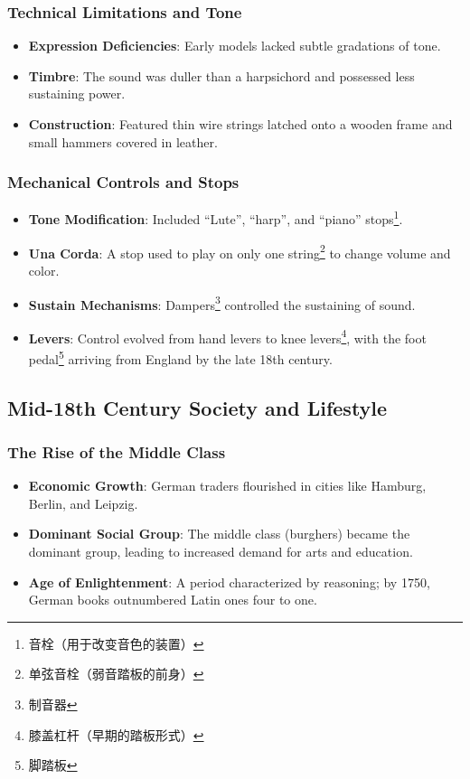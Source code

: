 \documentclass[math,code]{amznotes}
\theoremstyle{remark}
\begin{document}
\subsubsection{Technical Limitations and Tone}
\begin{itemize}
    \item \textbf{Expression Deficiencies}: Early models lacked subtle gradations of tone.
    \item \textbf{Timbre}: The sound was duller than a harpsichord and possessed less sustaining power.
    \item \textbf{Construction}: Featured thin wire strings latched onto a wooden frame and small hammers covered in leather.
\end{itemize}

\subsubsection{Mechanical Controls and Stops}
\begin{itemize}
    \item \textbf{Tone Modification}: Included ``Lute'', ``harp'', and ``piano'' stops\footnote{音栓（用于改变音色的装置）}.
    \item \textbf{Una Corda}: A stop used to play on only one string\footnote{单弦音栓（弱音踏板的前身）} to change volume and color.
    \item \textbf{Sustain Mechanisms}: Dampers\footnote{制音器} controlled the sustaining of sound.
    \item \textbf{Levers}: Control evolved from hand levers to knee levers\footnote{膝盖杠杆（早期的踏板形式）}, with the foot pedal\footnote{脚踏板} arriving from England by the late 18th century.
\end{itemize}

\subsection{Mid-18th Century Society and Lifestyle}

\subsubsection{The Rise of the Middle Class}
\begin{itemize}
    \item \textbf{Economic Growth}: German traders flourished in cities like Hamburg, Berlin, and Leipzig.
    \item \textbf{Dominant Social Group}: The middle class (burghers) became the dominant group, leading to increased demand for arts and education.
    \item \textbf{Age of Enlightenment}: A period characterized by reasoning; by 1750, German books outnumbered Latin ones four to one.
\end{itemize}
\end{document}
